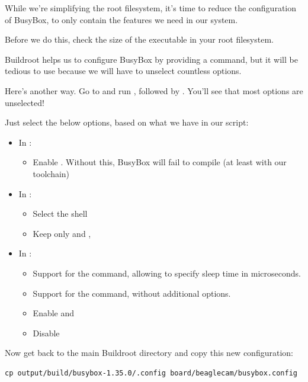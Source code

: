 While we're simplifying the root filesystem, it's time to reduce the
configuration of BusyBox, to only contain the features we need in our
system.

Before we do this, check the size of the  executable in
your root filesystem.

Buildroot helps us to configure BusyBox by providing a  command, but it will be tedious to use because we
will have to unselect countless options.

Here's another way. Go to  and run
, followed by . You'll see
that most options are unselected!

Just select the below options, based on what we have in our
 script:
\begin{itemize}
  \item In :
  \begin{itemize}
     \item Enable . Without this, BusyBox
           will fail to compile (at least with our toolchain)
  \end{itemize}
  \item In :
  \begin{itemize}
     \item Select the  shell
     \item Keep only  and
           ,
  \end{itemize}
  \item In :
  \begin{itemize}
     \item Support for the  command, allowing to specify
           sleep time in microseconds.
     \item Support for the  command, without additional options.
     \item Enable  and \code{test as [}
     \item Disable 
  \end{itemize}
\end{itemize}

Now get back to the main Buildroot directory and copy this new
configuration:

\begin{verbatim}
cp output/build/busybox-1.35.0/.config board/beaglecam/busybox.config
\end{verbatim}

